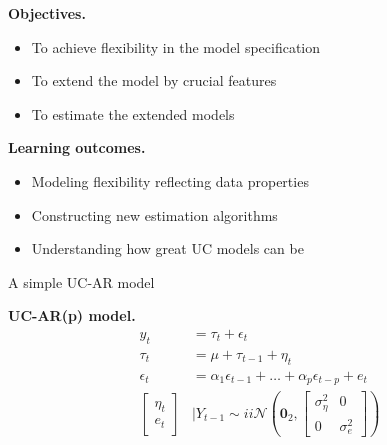 \documentclass[notes,blackandwhite,mathsans,usenames,dvipsnames]{beamer}
\begin{document}
{
\begin{frame}

\bigskip\textbf{\color{mcxs1}Objectives.}
\begin{itemize}[label=$\blacktriangleright$]
\item {\color{mcxs1}To achieve flexibility in the model specification}
\item {\color{mcxs1}To extend the model by crucial features}
\item {\color{mcxs1}To estimate the extended models}
\end{itemize}

\bigskip\textbf{\color{mcxs2}Learning outcomes.}
\begin{itemize}[label=$\blacktriangleright$]
\item {\color{mcxs2}Modeling flexibility reflecting data properties}
\item {\color{mcxs2}Constructing new estimation algorithms}
\item {\color{mcxs2}Understanding how great UC models can be}
\end{itemize}

\end{frame}
}








\begin{frame}{A simple UC-AR model}

\smallskip\textbf{UC-AR(p) model.}
\begin{align*}
y_t &= \tau_t + \epsilon_t\\[1ex]
\tau_t &= \mu + \tau_{t-1} + \eta_t\\[1ex]
\epsilon_t &= \alpha_1\epsilon_{t-1} + \dots + \alpha_p\epsilon_{t-p} +  e_t\\[2ex]
\begin{bmatrix}\eta_t \\ e_t\end{bmatrix}&\bigg|Y_{t-1} \sim ii\mathcal{N}\left(\mathbf{0}_2, \begin{bmatrix}\sigma_\eta^2 & 0 \\ 0 & \sigma_e^2\end{bmatrix} \right)
\end{align*}

\end{frame}
\end{document}

